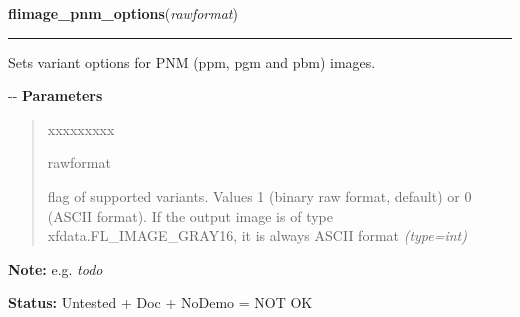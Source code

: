 \hspace{.8\funcindent}\begin{boxedminipage}{\funcwidth}

    \raggedright \textbf{flimage\_pnm\_options}(\textit{rawformat})

    \vspace{-1.5ex}

    \rule{\textwidth}{0.5\fboxrule}
\setlength{\parskip}{2ex}

Sets variant options for PNM (ppm, pgm and pbm) images.

-{}-
\setlength{\parskip}{1ex}
      \textbf{Parameters}
      \vspace{-1ex}

      \begin{quote}
        \begin{Ventry}{xxxxxxxxx}

          \item[rawformat]


flag of supported variants. Values 1 (binary raw format, default)
or 0 (ASCII format). If the output image is of type
xfdata.FL\_IMAGE\_GRAY16, it is always ASCII format
            {\it (type=int)}

        \end{Ventry}

      \end{quote}

\textbf{Note:} 
e.g. \emph{todo}


\textbf{Status:} 
Untested + Doc + NoDemo = NOT OK


    \end{boxedminipage}

    \label{xformslib:flflimage:flimage_gif_output_options}

    \vspace{0.5ex}

